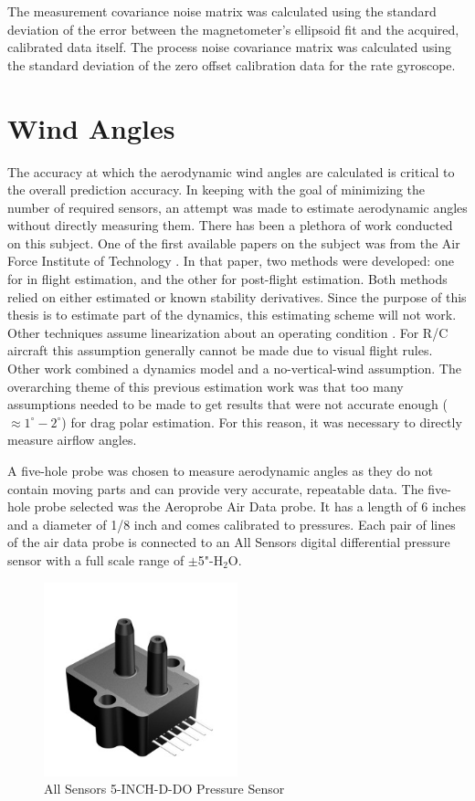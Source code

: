 The measurement covariance noise matrix was calculated using the standard deviation of the error between the magnetometer's ellipsoid fit and the acquired, calibrated data itself. The process noise covariance matrix was calculated using the standard deviation of the zero offset calibration data for the rate gyroscope.

\section{Wind Angles}
The accuracy at which the aerodynamic wind angles are calculated is critical to the overall prediction accuracy. In keeping with the goal of minimizing the number of required sensors, an attempt was made to estimate aerodynamic angles without directly measuring them. There has been a plethora of work conducted on this subject. One of the first available papers on the subject was from the Air Force Institute of Technology \cite{joseph1988}. In that paper, two methods were developed: one for in flight estimation, and the other for post-flight estimation. Both methods relied on either estimated or known stability derivatives. Since the purpose of this thesis is to estimate part of the dynamics, this estimating scheme will not work. Other techniques assume linearization about an operating condition \cite{morelli2012real}. For R/C aircraft this assumption generally cannot be made due to visual flight rules. Other work \cite{Lie2013} combined a dynamics model and a no-vertical-wind assumption. The overarching theme of this previous estimation work was that too many assumptions needed to be made to get results that were not accurate enough ($\approx1^\circ-2^\circ$) for drag polar estimation. For this reason, it was necessary to directly measure airflow angles.

\indent
A five-hole probe was chosen to measure aerodynamic angles as they do not contain moving parts and can provide very accurate, repeatable data. The five-hole probe selected was the Aeroprobe Air Data probe. It has a length of 6 inches and a diameter of 1/8 inch and comes calibrated to pressures. Each pair of lines of the air data probe is connected to an All Sensors digital differential pressure sensor with a full scale range of $\pm$5"-H$_2$O\cite{allsensorsDDO}.

\begin{figure}[H]
  \caption{All Sensors 5-INCH-D-DO Pressure Sensor} \label{allsensorsPressurePic}
  \centering
    \includegraphics[width=0.5\textwidth]{figures/allsensorsPressure.jpg}
\end{figure}

